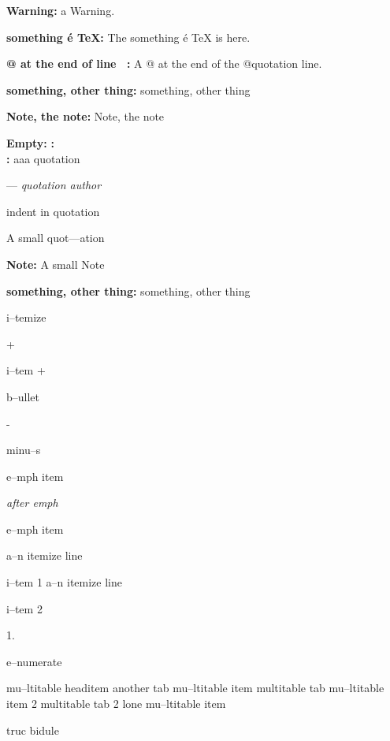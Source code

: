 \documentclass{book}
\begin{document}
\begin{titlepage}
\textbf{Warning:} a Warning.

\textbf{something \'{e} \TeX{}:} The something \'{e} \TeX{} is here.

\textbf{@ at the end of line \ {}:} A @ at the end of the @quotation line.

\textbf{something, other thing:} something, other thing

\textbf{Note, the note:} Note, the note


\textbf{Empty:} 
\textbf{:} 
\textbf{\leavevmode{}\\:} 
aaa quotation
\begin{center}
--- \emph{quotation author}
\end{center}

indent in quotation

A small quot---ation

\textbf{Note:} A small Note

\textbf{something, other thing:} something, other thing

\textbullet{} 

i--temize

+ 

i--tem +

\textbullet{} 

b--ullet

- 

minu--s

\emph{} 

e--mph item

\emph{after emph} 

e--mph item

\textbullet{} a--n itemize line 

i--tem 1
\textbullet{} a--n itemize line 

i--tem 2

1. 

e--numerate

mu--ltitable headitem another tab
mu--ltitable item multitable tab
mu--ltitable item 2 multitable tab 2
lone mu--ltitable item

truc bidule


\end{titlepage}
\end{document}
